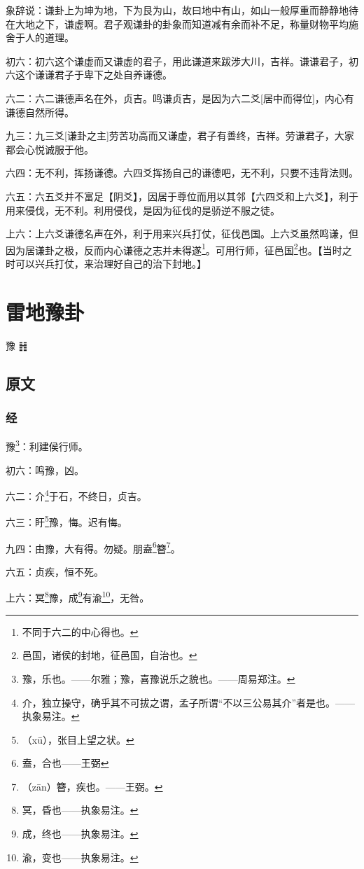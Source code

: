 \documentclass[12pt,oneside]{book}
\begin{document}
象辞说：谦卦上为坤为地，下为艮为山，故曰地中有山，如山一般厚重而静静地待在大地之下，谦虚啊。君子观谦卦的卦象而知道减有余而补不足，称量财物平均施舍于人的道理。

初六：初六这个谦虚而又谦虚的君子，用此谦道来跋涉大川，吉祥。谦谦君子，初六这个谦谦君子于卑下之处自养谦德。

六二：六二谦德声名在外，贞吉。鸣谦贞吉，是因为六二爻[居中而得位]，内心有谦德自然所得。

九三：九三爻[谦卦之主]劳苦功高而又谦虚，君子有善终，吉祥。劳谦君子，大家都会心悦诚服于他。

六四：无不利，挥扬谦德。六四爻挥扬自己的谦德吧，无不利，只要不违背法则。

六五：六五爻并不富足【阴爻】，因居于尊位而用以其邻【六四爻和上六爻】，利于用来侵伐，无不利。利用侵伐，是因为征伐的是骄逆不服之徒。

上六：上六爻谦德名声在外，利于用来兴兵打仗，征伐邑国。上六爻虽然鸣谦，但因为居谦卦之极，反而内心谦德之志并未得遂\footnote{不同于六二的中心得也。}。可用行师，征邑国\footnote{邑国，诸侯的封地，征邑国，自治也。}也。【当时之时可以兴兵打仗，来治理好自己的治下封地。】


\chapter{雷地豫卦}
豫 {\Large ䷏}

\section{原文}

\subsection{经}
豫\footnote{豫，乐也。——尔雅；豫，喜豫说乐之貌也。——周易郑注。}：利建侯行师。

初六：鸣豫，凶。

六二：介\footnote{介，独立操守，确乎其不可拔之谓，孟子所谓“不以三公易其介”者是也。——执象易注。}于石，不终日，贞吉。

六三：盱\footnote{（xū），张目上望之状。}豫，悔。迟有悔。

九四：由豫，大有得。勿疑。朋盍\footnote{盍，合也——王弼}簪\footnote{（zān）簪，疾也。——王弼。}。

六五：贞疾，恒不死。

上六：冥\footnote{冥，昏也——执象易注。}豫，成\footnote{成，终也——执象易注。}有渝\footnote{渝，变也——执象易注。}，无咎。
\end{document}
